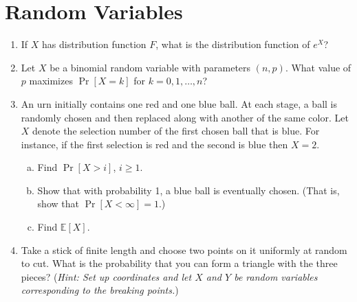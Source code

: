 \documentclass[11pt,letterpaper]{article}
\newcommand{\E}{\mathbb{E}}
\begin{document}
\section{Random Variables}
\begin{enumerate}
	\item If $X$ has distribution function $F$, what is the distribution function of $e^X$?
	
	\item Let $X$ be a binomial random variable with parameters $(n, p)$. What value of $p$ maximizes $\Pr[X=k]$ for $k = 0, 1, \ldots, n$?

	\item An urn initially contains one red and one blue ball. At each stage, a ball is randomly chosen and then replaced along with another of the same color. Let $X$ denote the selection number of the first chosen ball that is blue. For instance, if the first selection is red and the second is blue then $X = 2$.
	\begin{enumerate}[(a)]
		\item Find $\Pr[X>i]$, $i\geq 1$.
		\item Show that with probability 1, a blue ball is eventually chosen. (That is, show that $\Pr[X<\infty]=1$.)
		\item Find $\E[X]$.
	\end{enumerate}

	\item Take a stick of finite length and choose two points on it uniformly at random to cut. What is the probability that you can form a triangle with the three pieces? (\textit{Hint: Set up coordinates and let $X$ and $Y$ be random variables corresponding to the breaking points.})
\end{enumerate}
\end{document}
